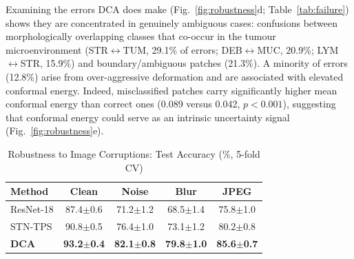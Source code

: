 \documentclass[pdflatex,sn-nature]{sn-jnl}%
\theoremstyle{thmstyleone}%
\theoremstyle{thmstyletwo}%
\theoremstyle{thmstylethree}%
\begin{document}
Examining the errors DCA does make (Fig.~\ref{fig:robustness}d;
Table~\ref{tab:failure}) shows they are concentrated in genuinely ambiguous
cases: confusions between morphologically overlapping classes that co-occur in
the tumour microenvironment (STR$\leftrightarrow$TUM, 29.1\% of errors;
DEB$\leftrightarrow$MUC, 20.9\%; LYM$\leftrightarrow$STR, 15.9\%) and
boundary/ambiguous patches (21.3\%). A minority of errors (12.8\%) arise from
over-aggressive deformation and are associated with elevated conformal energy.
Indeed, misclassified patches carry significantly higher mean conformal energy
than correct ones (0.089 versus 0.042, $p<0.001$), suggesting that conformal
energy could serve as an intrinsic uncertainty signal
(Fig.~\ref{fig:robustness}e).

\begin{table}[t]
\centering
\caption{Robustness to Image Corruptions: Test Accuracy (\%, 5-fold CV)}
\label{tab:robustness}
\begin{tabularx}{\textwidth}{Xcccc}
\hline
\textbf{Method} & \textbf{Clean} & \textbf{Noise} & \textbf{Blur} & \textbf{JPEG} \\
\hline
ResNet-18 & 87.4$\pm$0.6 & 71.2$\pm$1.2 & 68.5$\pm$1.4 & 75.8$\pm$1.0 \\
STN-TPS & 90.8$\pm$0.5 & 76.4$\pm$1.0 & 73.1$\pm$1.2 & 80.2$\pm$0.8 \\
\textbf{DCA} & \textbf{93.2$\pm$0.4} & \textbf{82.1$\pm$0.8} & \textbf{79.8$\pm$1.0} & \textbf{85.6$\pm$0.7} \\
\hline
\end{tabularx}
\end{table}
\end{document}
